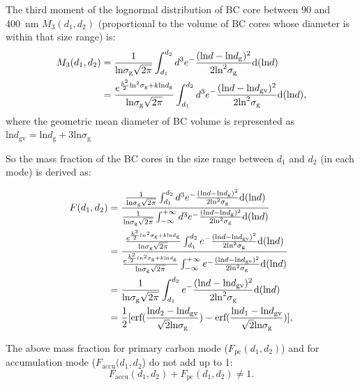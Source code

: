\documentclass[12pt, fullpage]{uiucthesis2009}
\begin{document}
	The third moment of the lognormal distribution of BC core between 90 and 400~nm $M_{3}(d_{1}, d_{2})$ (proportional to the volume of BC cores whose diameter is within that size range) is:
	\begin{align*}
	M_{3}(d_{1}, d_{2}) &= \frac{1}{\text{ln}\sigma_{\text{g}}\sqrt{2\pi}}\int_{d_{1}}^{d_{2}}d^3e^-\frac{(\text{ln}d - \text{ln}d_{\rm g})^2}{2\text{ln}^2\sigma_{\text{g}}}\text{d}(\text{ln}d)  \\
	&=\frac{e^{\frac{k^2}{2}\text{ln}^2\sigma_{\rm g}+k\text{ln}d_{\rm g}}}{\text{ln}\sigma_{\text{g}}\sqrt{2\pi}}\int_{d_{1}}^{d_{2}}d^3e^-\frac{(\text{ln}d - \text{ln}d_{\text{gv}})^2}{2\text{ln}^2\sigma_{\text{g}}}\text{d}(\text{ln}d),
	\end{align*}
	where the geometric mean diameter of BC volume is represented as $\text{ln}d_{\text{gv}}
	= \text{ln}d_{\text{g}} + 3\text{ln}\sigma_{\text{g}}$
	
	So the mass fraction of the BC cores in the size range between $d_{1}$ and $d_{2}$ (in each mode) is derived as:
	
	\begin{align*}
	F(d_{1}, d_{2}) &= \frac{\frac{1}{\text{ln}\sigma_{\text{g}}\sqrt{2\pi}}\int_{d_{1}}^{d_{2}}d^3e^-\frac{(\text{ln}d - \text{ln}d_{\rm g})^2}{2\text{ln}^2\sigma_{\text{g}}}\text{d}(\text{ln}d)}
	{\frac{1}{\text{ln}\sigma_{\text{g}}\sqrt{2\pi}}\int_{-\infty}^{+\infty}d^3e^-\frac{(\text{ln}d - \text{ln}d_{\rm g})^2}{2\text{ln}^2\sigma_{\text{g}}}\text{d}(\text{ln}d)}  \\
	&=\frac{\frac{e^{\frac{k^2}{2}ln^2\sigma_{\rm g}+k\text{ln}d_{\rm g}}}{\text{ln}\sigma_{\text{g}}\sqrt{2\pi}}\int_{d_{1}}^{d_{2}}e^-\frac{(\text{ln}d - \text{ln}d_{\text{gv}})^2}{2\text{ln}^2\sigma_{\text{g}}}\text{d}(\text{ln}d)}{\frac{e^{\frac{k^2}{2}ln^2\sigma_{\rm g}+k\text{ln}d_{\rm g}}}{\text{ln}\sigma_{\text{g}}\sqrt{2\pi}}\int_{-\infty}^{+\infty}e^-\frac{(\text{ln}d - \text{ln}d_{\text{gv}})^2}{2\text{ln}^2\sigma_{\text{g}}}\text{d}(\text{ln}d)}\\
	&=\frac{1}{\text{ln}\sigma_{\text{g}}\sqrt{2\pi}}\int_{d_{1}}^{d_{2}}e^-\frac{(\text{ln}d - \text{ln}d_{\text{gv}})^2}{2\text{ln}^2\sigma_{\text{g}}}\text{d}(\text{ln}d) \\
	&=\frac{1}{2}[\text{erf}(\frac{\text{ln}d_{2} - \text{ln}d_{\text{gv}}}{\sqrt{2}\text{ln}\sigma_{\rm g}})-\text{erf}(\frac{\text{ln}d_{1} - \text{ln}d_{\text{gv}}}{\sqrt{2}\text{ln}\sigma_{\rm g}})],
	\end{align*}
	
	The above mass fraction for primary carbon mode ($F_{\text{pc}}(d_{1}, d_{2})$) and for accumulation mode ($F_{\text{accu}}(d_{1}, d_{2}$) do not add up to 1:
	\[F_{\text{accu}}(d_{1}, d_{2}) + F_{\text{pc}}(d_{1}, d_{2}) \neq 1.\]
	
\end{document}
